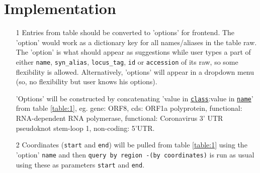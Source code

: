 \documentclass[a4paper, 10pt]{article}        %
\begin{document}
\section{Implementation} 
\begin{itemize}
\item[1] Entries from table should be converted to 'options' for frontend. The 'option' would work as a dictionary key for all names/aliases in the table raw. The 'option' is what should appear as suggestions while user types a part of either \texttt{name}, \texttt{syn\_alias},  \texttt{locus\_tag}, \texttt{id} or \texttt{accession} of its raw, so some flexibility is allowed. Alternatively, 'options' will appear in a dropdown menu (so, no flexibility but user knows his options).

'Options' will be constructed by concatenating 'value in \underline{\texttt{class}}:value in \underline{\texttt{name}}' from table \ref{table:1}, eg. gene: ORF8, cds: ORF1a polyprotein, functional: RNA-dependent RNA polymerase, functional: Coronavirus 3' UTR pseudoknot stem-loop 1, non-coding: 5'UTR.






\item[2] Coordinates (\texttt{start} and \texttt{end}) will be pulled from table \ref{table:1} using the 'option' \texttt{name} and then \texttt{query by region -(by coordinates)} is run as usual using these as parameters \texttt{start} and \texttt{end}.

\end{itemize}





\end{document}
